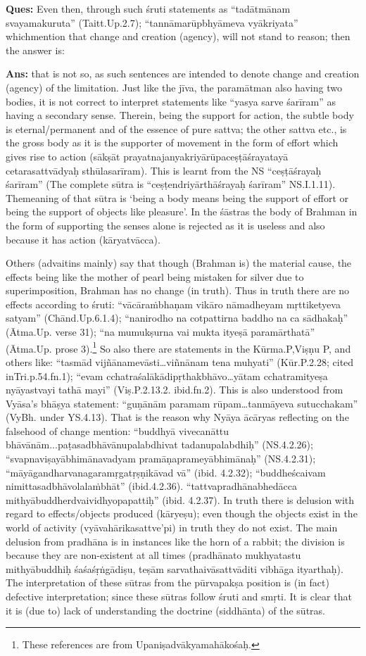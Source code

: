 \textbf{Ques:} Even then, through such śruti statements as “tadātmānam svayamakuruta” (Taitt.Up.2.7); “tannāmarūpbhyāmeva vyākriyata” which\break mention that change and creation (agency), will not stand to reason; then the answer is:

\textbf{Ans:} that is not so, as such sentences are intended to denote change and creation (agency) of the limitation. Just like the jīva, the paramātman also having two bodies, it is not correct to interpret statements like “yasya sarve śarīram” as having a secondary sense. Therein, being the support for action, the subtle body is eternal/permanent and of the essence of pure sattva; the other sattva etc., is the gross body as it is the supporter of movement in the form of effort which gives rise to action (sākṣāt prayatnajanyakriyārūpaceṣṭāśrayatayā cetarasattvādyaḥ sthūlasarīram). This is learnt from the NS “ceṣṭāśrayaḥ śarīram” (The complete sūtra is “ceṣṭendriyārthāśrayaḥ śarīram” NS.I.1.11). The\break meaning of that sūtra is ‘being a body means being the support of effort or being the support of objects like pleasure’. In the śāstras the body of Brahman in the form of supporting the senses alone is rejected as it is useless and also because it has action (kāryatvācca).

Others (advaitins mainly) say that though (Brahman is) the material cause, the effects being like the mother of pearl being mistaken for silver due to superimposition, Brahman has no change (in truth). Thus in truth there are no effects according to śruti: “vācāraṁbhaṇam vikāro nāmadheyam mṛttiketyeva satyam” (Chānd.Up.6.1.4); “nanirodho na cotpattirna baddho na ca sādhakaḥ” (Ātma.Up. verse 31); “na mumukṣurna vai mukta ityeṣā paramārthatā” (Ātma.Up. prose 3).\footnote{These references are from Upaniṣadvākyamahākośaḥ.} So also there are statements in the  Kūrma.P,Viṣṇu P, and others like: “tasmād vijñānamevāsti…viñnānam tena muhyati” (Kūr.P.2.28; cited in\break Tri.p.54.fn.1);  “evam cchatraśalākādipṛthakbhāvo…yātam cchatramityeṣa nyāyastvayi tathā mayi” (Viṣ.P.2.13.2. ibid.fn.2). This is also understood from Vyāsa’s bhāṣya statement: “guṇānām paramam rūpam\-…tanmāyeva sutucchakam” (VyBh. under YS.4.13). That is the reason why Nyāya ācāryas reflecting on the falsehood of change mention: “buddhyā vivecanāttu bhāvānām...paṭasadbhāvānupalabdhivat tadanupalabdhiḥ” (NS.4.2.26); “svapnaviṣayābhimānavadyam pramā\-ṇaprameyābhimānaḥ” (NS.4.2.31); “māyāgandharvanagaramṛgatṛṣṇi\-kāvad vā” (ibid. 4.2.32); “buddheścaivam nimittasadbhāvolalaṁbhāt” (ibid.4.2.36). ``tattvapradhānabhedācca mithyābuddherdvaividhyopapattiḥ'' (ibid. 4.2.37). In truth there is delusion with regard to effects/objects produced (kāryeṣu); even though the objects exist in the world of activity (vyāvahārikasattve’pi) in truth they do not exist. The main delusion from pradhāna is in instances like the horn of a rabbit; the division is because they are non-existent at all times (pradhānato mukhyatastu mithyābuddhiḥ śaśaśṛṅgādiṣu, teṣām sarvathaivāsattvā\-diti vibhāga ityarthaḥ). The interpretation of these sūtras from the pūrvapakṣa position is (in fact) defective interpretation;  since these sūtras follow śruti and smṛti. It is clear that it is (due to) lack of understanding the doctrine (siddhānta) of the sūtras.

